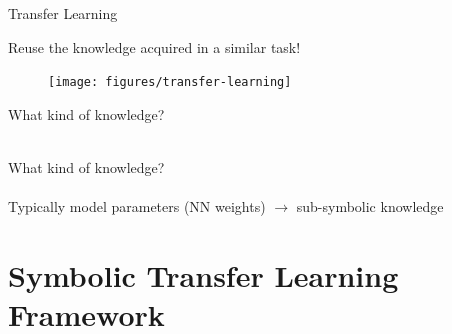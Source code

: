 \documentclass[presentation]{beamer}\mode<presentation>{\usetheme{blackAMSBolognaFC}}
\begin{document}
\begin{frame}[allowframebreaks]{Transfer Learning}

    \centering
    Reuse the knowledge acquired in a \alert{similar} task!

    \framebreak

    \begin{figure}
        \texttt{[image: figures/transfer-learning]}
    \end{figure}

    \framebreak

    \centering
    What kind of knowledge?
    \\
    \vspace{0.5cm}
    \\

    \framebreak

    \centering
    What kind of knowledge?
    \\
    \vspace{0.5cm}
    \\
    Typically model parameters (NN weights) $\rightarrow$ \alert{sub-symbolic} knowledge


\end{frame}

\section{Symbolic Transfer Learning Framework}
\end{document}
